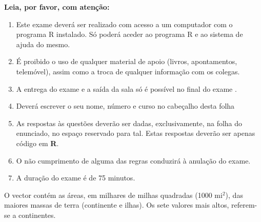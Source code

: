 \documentclass[addpoints]{exam}
\begin{document}
{{\large\textbf{Leia, por favor, com atenção:}}
\begin{enumerate}
	\item Este exame deverá ser realizado com acesso a um computador com o programa R instalado. Só poderá aceder ao programa R e ao sistema de ajuda do mesmo.
	\item É proibido o uso de qualquer material de apoio (livros, apontamentos, telemóvel), assim como a troca de qualquer informação com os colegas.
	\item A entrega do exame e a saída da sala só é possível no final do exame .
	\item Deverá escrever o seu nome, número e curso no cabeçalho desta folha
	\item As respostas às questões deverão ser dadas, exclusivamente, na folha do enunciado, no espaço reservado para tal. Estas respostas deverão ser apenas código em \textbf{R}.
	\item O não cumprimento de alguma das regras conduzirá à anulação do exame.
	\item A duração do exame é de 75 minutos.
\end{enumerate}

\vspace{10mm}

\begin{questions}
	\question O vector  contém as áreas, em milhares de milhas quadradas (1000 mi$^2$), das maiores massas de terra (continente e ilhas). Os sete valores mais altos, referem-se a continentes.
	
\end{questions}}
\end{document}

